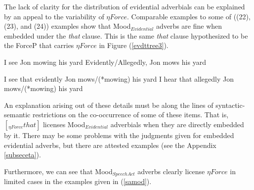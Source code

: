 \documentclass{article}
\begin{document}
The lack of clarity for the distribution of evidential adverbials can be explained by an appeal to the variability of $\eta Force$. Comparable examples to some of  ((22), (23), and (24)) examples show that Mood$_{Evidential}$ adverbs are fine when embedded under the {\sl that} clause. This is the same {\sl that} clause hypothesized to be the ForceP that carries $\eta Force$ in Figure (\ref{evdttree3}).

\begin{exe}
\ex I see Jon mowing his yard\label{iseejonmow}
\ex Evidently/Allegedly, Jon mows his yard
\begin{xlist}
\ex I see that evidently Jon mows/(*mowing) his yard
\ex I hear that allegedly Jon mows/(*mowing) his yard
\end{xlist}
\end{exe}
 
An explanation arising out of these details must be along the lines of syntactic-semantic restrictions on the co-occurrence of some of these items. That is, $[_{\eta Force}{} that]$ licenses Mood$_{Evidential}$ adverbials when they are directly embedded by it. There may be some problems with the judgments given for embedded evidential adverbs, but there are attested examples (see the Appendix \ref{subseceta}).  


Furthermore, we can see that Mood$_{Speech Act}$ adverbs clearly license $\eta Force$ in limited cases in the examples given in (\ref{samod}). 
\end{document}
